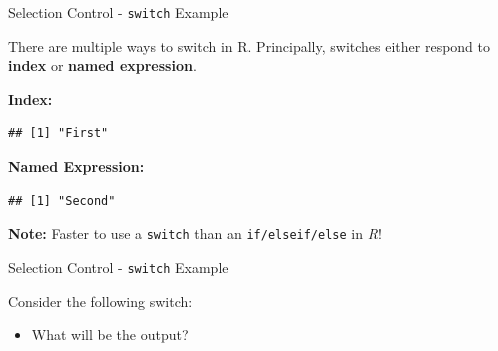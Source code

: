 \begin{frame}[fragile]{Selection Control - \texttt{switch} Example}

There are multiple ways to switch in R. Principally, switches either
respond to \textbf{index} or \textbf{named expression}.

\textbf{Index:}

\begin{Shaded}
\begin{Highlighting}[]
\NormalTok{, }
       \NormalTok{,}
       \NormalTok{)}
\end{Highlighting}
\end{Shaded}

\begin{verbatim}
## [1] "First"
\end{verbatim}

\textbf{Named Expression:}

\begin{Shaded}
\begin{Highlighting}[]
\NormalTok{, }
        \NormalTok{, }
        \NormalTok{, }
       \NormalTok{)}
\end{Highlighting}
\end{Shaded}

\begin{verbatim}
## [1] "Second"
\end{verbatim}

\textbf{Note:} Faster to use a \texttt{switch} than an
\texttt{if/elseif/else} in \emph{R}!

\end{frame}

\begin{frame}[fragile]{Selection Control - \texttt{switch} Example}

Consider the following switch:

\begin{Shaded}
\begin{Highlighting}[]
\NormalTok{, }
        \NormalTok{, }
        \NormalTok{, }
       \NormalTok{)}
\end{Highlighting}
\end{Shaded}

\begin{itemize}
\tightlist
\item
  What will be the output?
\end{itemize}

\end{frame}

